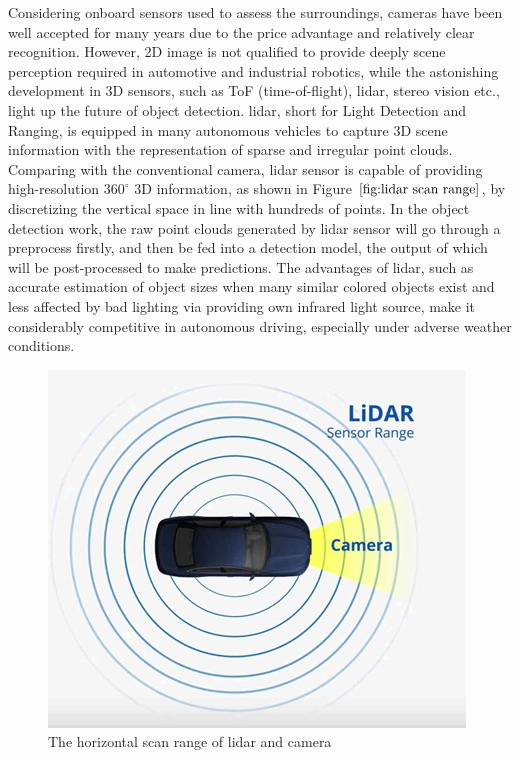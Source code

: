 Considering onboard sensors used to assess the surroundings, cameras have been well accepted for many years due to the price advantage and relatively clear recognition. However, 2D image is not qualified to provide deeply scene perception required in automotive and industrial robotics, while the astonishing development in 3D sensors, such as ToF (time-of-flight), \acrshort{lidar}, stereo vision etc., light up the future of object detection. \acrshort{lidar}, short for Light Detection and Ranging, is equipped in many autonomous vehicles to capture 3D scene information with the representation of sparse and irregular point clouds. Comparing with the conventional camera, \acrshort{lidar} sensor is capable of providing high-resolution \(360^{\circ}\) 3D information, as shown in Figure \(\ref{fig:lidar scan range}\), by discretizing the vertical space in line with hundreds of points.  In the object detection work, the raw point clouds generated by \acrshort{lidar} sensor will go through a preprocess firstly, and then be fed into a detection model, the output of which will be post-processed to make predictions. The advantages of \acrshort{lidar}, such as accurate estimation of object sizes when many similar colored objects exist and less affected by bad lighting via providing own infrared light source, make it considerably competitive in autonomous driving, especially under adverse weather conditions.

\begin{figure}[!htbp]
\centering
\includegraphics[scale=0.6]{Graphics/Lidar scan range.jpg}
\caption{The horizontal scan range of \acrshort{lidar} and camera\cite{Lidar}}
\label{fig:lidar scan range}
\end{figure}

